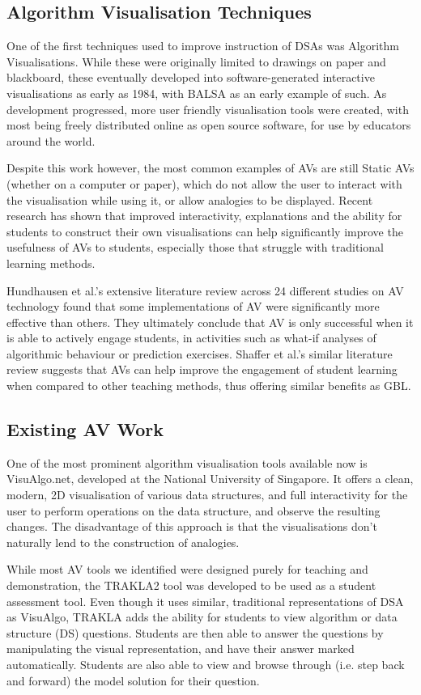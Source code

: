 \documentclass[11pt]{article}
\begin{document}
\subsection{Algorithm Visualisation Techniques}
One of the first techniques used to improve instruction of DSAs was Algorithm Visualisations. While these were originally limited to drawings on paper and blackboard, these eventually developed into software-generated interactive visualisations as early as 1984, with BALSA\cite{Brown:1984:SAA:964965.808596} as an early example of such. As development progressed, more user friendly visualisation tools were created, with most being freely distributed online as open source software, for use by educators around the world.\par
Despite this work however, the most common examples of AVs are still Static AVs (whether on a computer or paper), which do not allow the user to interact with the visualisation while using it, or allow analogies to be displayed. Recent research has shown that improved interactivity, explanations\cite{vegh2} and the ability for students to construct their own visualisations can help significantly improve the usefulness of AVs to students, especially those that struggle with traditional learning methods\cite{Stasko:1993:AAA:169059.169078}.\par
Hundhausen et al.'s extensive literature review across 24 different studies on AV technology found that some implementations of AV were significantly more effective than others\cite{metaStudy}. They ultimately conclude that AV is only successful when it is able to actively engage students, in activities such as what-if analyses of algorithmic behaviour or prediction exercises. Shaffer et al.'s similar literature review suggests that AVs can help improve the engagement of student learning when compared to other teaching methods, thus offering similar benefits as GBL\cite{Shaffer:2010:AVS:1821996.1821997}.
\subsection{Existing AV Work}
One of the most prominent algorithm visualisation tools available now is VisuAlgo.net\cite{visualgo}, developed at the National University of Singapore. It offers a clean, modern, 2D visualisation of various data structures, and full interactivity for the user to perform operations on the data structure, and observe the resulting changes. The disadvantage of this approach is that the visualisations don't naturally lend to the construction of analogies.\par
While most AV tools we identified were designed purely for teaching and demonstration, the TRAKLA2\cite{TRAKLA2} tool was developed to be used as a student assessment tool. Even though it uses similar, traditional representations of DSA as VisuAlgo, TRAKLA adds the ability for students to view algorithm or data structure (DS) questions. Students are then able to answer the questions by manipulating the visual representation, and have their answer marked automatically. Students are also able to view and browse through (i.e. step back and forward) the model solution for their question.
\end{document}
